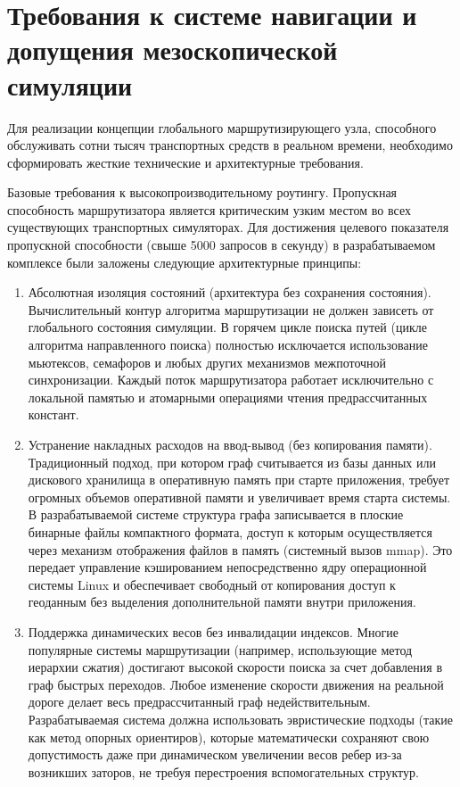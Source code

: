 \section{Требования к системе навигации и допущения мезоскопической симуляции}

Для реализации концепции глобального маршрутизирующего узла, способного обслуживать сотни тысяч транспортных средств в реальном времени, необходимо сформировать жесткие технические и архитектурные требования. 

Базовые требования к высокопроизводительному роутингу.
Пропускная способность маршрутизатора является критическим узким местом во всех существующих транспортных симуляторах. Для достижения целевого показателя пропускной способности (свыше 5000 запросов в секунду) в разрабатываемом комплексе были заложены следующие архитектурные принципы:

\begin{enumerate}
    \item Абсолютная изоляция состояний (архитектура без сохранения состояния). Вычислительный контур алгоритма маршрутизации не должен зависеть от глобального состояния симуляции. В горячем цикле поиска путей (цикле алгоритма направленного поиска) полностью исключается использование мьютексов, семафоров и любых других механизмов межпоточной синхронизации. Каждый поток маршрутизатора работает исключительно с локальной памятью и атомарными операциями чтения предрассчитанных констант.
    \item Устранение накладных расходов на ввод-вывод (без копирования памяти). Традиционный подход, при котором граф считывается из базы данных или дискового хранилища в оперативную память при старте приложения, требует огромных объемов оперативной памяти и увеличивает время старта системы. В разрабатываемой системе структура графа записывается в плоские бинарные файлы компактного формата, доступ к которым осуществляется через механизм отображения файлов в память (системный вызов mmap). Это передает управление кэшированием непосредственно ядру операционной системы Linux и обеспечивает свободный от копирования доступ к геоданным без выделения дополнительной памяти внутри приложения.
    \item Поддержка динамических весов без инвалидации индексов. Многие популярные системы маршрутизации (например, использующие метод иерархии сжатия) достигают высокой скорости поиска за счет добавления в граф быстрых переходов. Любое изменение скорости движения на реальной дороге делает весь предрассчитанный граф недействительным. Разрабатываемая система должна использовать эвристические подходы (такие как метод опорных ориентиров), которые математически сохраняют свою допустимость даже при динамическом увеличении весов ребер из-за возникших заторов, не требуя перестроения вспомогательных структур.
\end{enumerate}

